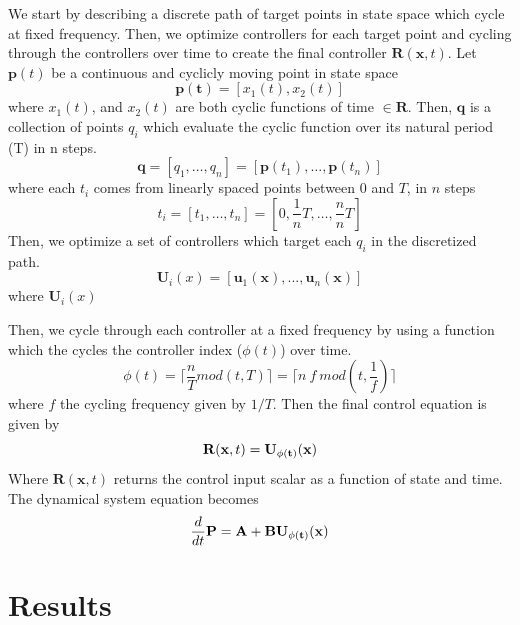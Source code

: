 \documentclass[12pt]{iopart}
\begin{document}
 We start by describing a discrete path  of target points in state space which cycle at fixed frequency.
  Then, we optimize controllers for each target point and cycling through the controllers over time to create the final controller $\mathbf{R}(\mathbf{x},t)$.
Let $\mathbf{p}(t)$ be a continuous and cyclicly moving point in state space
\begin{equation}
\mathbf{p(t)}=[x_1(t),x_2(t)]
\end{equation}
where $x_1(t)$, and $x_2(t)$ are both cyclic functions of time $\in \mathbf{R}$.
Then, $\mathbf{q}$ is a collection of points $q_i$ which evaluate the cyclic function over its natural period (T) in n steps. 
\begin{equation}
\mathbf{q}=[q_1,\ldots ,q_n]=[\mathbf{p}(t_1),\ldots,\mathbf{p}(t_n)]
\end{equation}
where each $t_i$ comes from linearly spaced points between $0$ and $T$, in $n$ steps 
\begin{equation}
t_i = [t_1,\ldots,t_n]=[0,\frac{1}{n} T,\ldots,\frac{n}{n}T]
\end{equation}
Then, we optimize a set of controllers which target each $q_i$ in the discretized path.
\begin{equation}
\mathbf{U}_i(x)=[\mathbf{u}_1(\mathbf{x}),...,\mathbf{u}_n(\mathbf{x})]
\end{equation}
where $\mathbf{U}_i(x)$

Then, we cycle through each controller at a fixed frequency by using a function which the cycles the controller index ($\phi(t)$) over time. \begin{equation}
\phi(t)=\lceil \frac{n}{T} mod(t,T)\rceil = \lceil n \ f \ mod(t,\frac{1}{f})\rceil
\end{equation}
where $f$ the cycling frequency given by $1/T$. Then the final control equation is given by 
 \begin{equation}
\mathbf{R}(\mathbf{x},t)=\bf{U}_{\phi(t)}(x)
\end{equation}
Where $\mathbf{R}(\mathbf{x},t)$ returns the control input scalar as a function of state and time. 
The dynamical system equation becomes
\begin{equation}
\frac{d}{dt}\mathbf{P}=\mathbf{A}+\mathbf{B}\bf{U}_{\phi(t)}(x)
\end{equation}

\section{Results}
\end{document}
